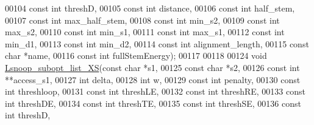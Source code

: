 \begin{DoxyCode}
00104                         \textcolor{keyword}{const} \textcolor{keywordtype}{int}   threshD,
00105                         \textcolor{keyword}{const} \textcolor{keywordtype}{int}   distance,
00106                         \textcolor{keyword}{const} \textcolor{keywordtype}{int}   half\_stem,
00107                         \textcolor{keyword}{const} \textcolor{keywordtype}{int}   max\_half\_stem,
00108                         \textcolor{keyword}{const} \textcolor{keywordtype}{int}   min\_s2,
00109                         \textcolor{keyword}{const} \textcolor{keywordtype}{int}   max\_s2,
00110                         \textcolor{keyword}{const} \textcolor{keywordtype}{int}   min\_s1,
00111                         \textcolor{keyword}{const} \textcolor{keywordtype}{int}   max\_s1,
00112                         \textcolor{keyword}{const} \textcolor{keywordtype}{int}   min\_d1,
00113                         \textcolor{keyword}{const} \textcolor{keywordtype}{int}   min\_d2,
00114                         \textcolor{keyword}{const} \textcolor{keywordtype}{int}   alignment\_length,
00115                         \textcolor{keyword}{const} \textcolor{keywordtype}{char}  *name,
00116                         \textcolor{keyword}{const} \textcolor{keywordtype}{int}   fullStemEnergy);
00117 
00118 
00124 \textcolor{keywordtype}{void} \mbox{\hyperlink{snoop_8h_ae15ae849db1f5b8ba22a289e34074fd7}{Lsnoop\_subopt\_list\_XS}}(\textcolor{keyword}{const} \textcolor{keywordtype}{char} *s1,
00125                            \textcolor{keyword}{const} \textcolor{keywordtype}{char} *s2,
00126                            \textcolor{keyword}{const} \textcolor{keywordtype}{int}  **access\_s1,
00127                            \textcolor{keywordtype}{int}        delta,
00128                            \textcolor{keywordtype}{int}        w,
00129                            \textcolor{keyword}{const} \textcolor{keywordtype}{int}  penalty,
00130                            \textcolor{keyword}{const} \textcolor{keywordtype}{int}  threshloop,
00131                            \textcolor{keyword}{const} \textcolor{keywordtype}{int}  threshLE,
00132                            \textcolor{keyword}{const} \textcolor{keywordtype}{int}  threshRE,
00133                            \textcolor{keyword}{const} \textcolor{keywordtype}{int}  threshDE,
00134                            \textcolor{keyword}{const} \textcolor{keywordtype}{int}  threshTE,
00135                            \textcolor{keyword}{const} \textcolor{keywordtype}{int}  threshSE,
00136                            \textcolor{keyword}{const} \textcolor{keywordtype}{int}  threshD,

\end{DoxyCode}
